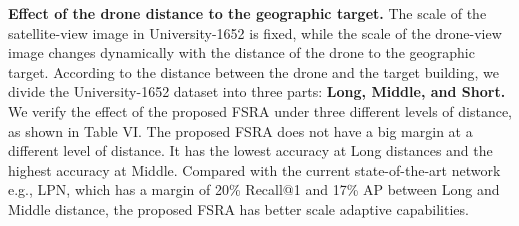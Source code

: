 \documentclass[lettersize,journal]{IEEEtran}
\begin{document}
\begin{table}[h]
\renewcommand\arraystretch{1.5}
\caption{Ablation study to verify the robustness of the proposed FSRA at different distances between drones and target in University-1652.}
\label{table6}
\end{table}

\textbf{Effect of the drone distance to the geographic target.} The scale of the satellite-view image in University-1652 is fixed, while the scale of the drone-view image changes dynamically with the distance of the drone to the geographic target. According to the distance between the drone and the target building, we divide the University-1652 dataset into three parts: \textbf{Long, Middle, and Short.}  We verify the effect of the proposed FSRA under three different levels of distance, as shown in Table VI. The proposed FSRA does not have a big margin at a different level of distance. It has the lowest accuracy at Long distances and the highest accuracy at Middle. Compared with the current state-of-the-art network e.g., LPN, which has a margin of 20\% Recall@1 and 17\% AP between Long and Middle distance, the proposed FSRA has better scale adaptive capabilities. 
\end{document}
